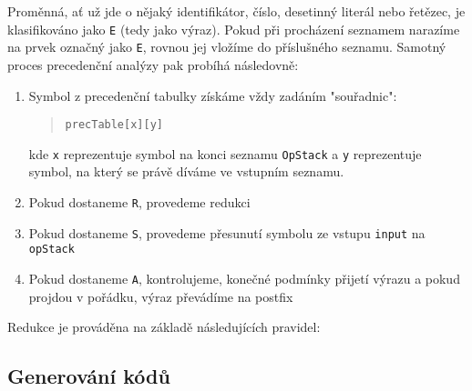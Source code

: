 \documentclass[czech,a4paper,12pt]{article}[]
\begin{document}
\begin{inpar}
\begin{inpar}
\medskip
Proměnná, ať už jde o nějaký identifikátor, číslo, desetinný literál nebo řetězec, je klasifikováno jako \texttt{E} (tedy jako výraz). Pokud při procházení seznamem narazíme na prvek označný jako \texttt{E}, rovnou jej vložíme do příslušného seznamu. Samotný proces precedenční analýzy pak probíhá následovně:

\begin{enumerate}
\item Symbol z precedenční tabulky získáme vždy zadáním "souřadnic":
\begin{quote}
\texttt{precTable[x][y]}
\end{quote}
kde \texttt{x} reprezentuje symbol na konci seznamu \texttt{OpStack} a \texttt{y} reprezentuje symbol, na který se právě díváme ve vstupním seznamu.
\item Pokud dostaneme \texttt{R}, provedeme redukci
\item Pokud dostaneme \texttt{S}, provedeme přesunutí symbolu ze vstupu \texttt{input} na \texttt{opStack}
\item Pokud dostaneme \texttt{A}, kontrolujeme, konečné podmínky přijetí výrazu a pokud projdou v pořádku, výraz převádíme na postfix
\end{enumerate}

\medskip
Redukce je prováděna na základě následujících pravidel:

\begin{center}
\end{center}

\end{inpar}


\subsection{Generování kódů}
\end{inpar}
\end{document}
